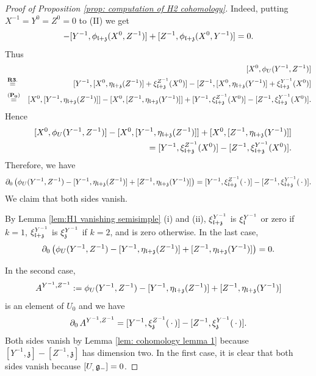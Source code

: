 \documentclass[12pt]{amsart}
\theoremstyle{plain}
\theoremstyle{definition}
\begin{document}
\begin{proof} [Proof of Proposition \ref{prop: computation of H2 cohomology}]
Indeed, putting $X^{-1}=Y^0=Z^0=0$ to (II) we get
  \begin{eqnarray*}
  [X^0, \phi_U(Y^{-1}, Z^{-1})]
     - [Y^{-1}, \phi_{\frak l+ \frak z}( X^{0}, Z^{-1})] + [Z^{-1}, \phi_{\frak l+ \frak z}( X^0, Y^{-1})] =0.
  \end{eqnarray*}
Thus
  \begin{eqnarray*}
  &&[X^0, \phi_U(Y^{-1}, Z^{-1})] \\
   &\stackrel{\bf R3.}{=}& [Y^{-1},[X^0, \eta_{\frak l + \frak z}(Z^{-1})] +\xi_{\frak l+\frak z}^{Z^{-1}}(X^0)] - [Z^{-1},[X ^0, \eta_{\frak l + \frak z}(Y^{-1})] +\xi_{\frak l+\frak z}^{Y^{-1}}(X^0)]  \\
   &\stackrel{(\bf P_0)}{=}&  [X^0,[Y^{-1}, \eta_{\frak l + \frak z}(Z^{-1})]]  - [X^0,[ Z^{-1}, \eta_{\frak l + \frak z}(Y^{-1})]]
     +[Y^{-1}, \xi_{\frak l+\frak z}^{Z^{-1}}(X^0)]  -[Z^{-1}, \xi_{\frak l+\frak z}^{Y^{-1}}(X^0)].
  \end{eqnarray*}
  Hence
  \begin{eqnarray*}
   &&[X^0, \phi_U(Y^{-1}, Z^{-1})]
   -[X^0,[Y^{-1}, \eta_{\frak l + \frak z}(Z^{-1})]]  + [X^0,[ Z^{-1}, \eta_{\frak l + \frak z}(Y^{-1})]] \\
   &&=  [Y^{-1}, \xi_{\frak l+\frak z}^{Z^{-1}}(X^0)]  -[Z^{-1}, \xi_{\frak l+\frak z}^{Y^{-1}}(X^0)].
    \end{eqnarray*}
    Therefore, we have
    \begin{eqnarray*}
    \partial_0\left( \phi_U(Y^{-1}, Z^{-1}) -[Y^{-1}, \eta_{\frak l+ \frak z}(Z^{-1})] + [Z^{-1}, \eta_{\frak l + \frak z}(Y^{-1})]\right)
     =[Y^{-1}, \xi_{ \frak l+\frak z}^{Z^{-1}}(\,\cdot\,)]  -[Z^{-1}, \xi_{\frak l+ \frak z}^{Y^{-1}}(\,\cdot\,)].
    \end{eqnarray*}
    We claim that both sides vanish.

   By Lemma \ref{lem:H1 vanishing semisimple} (i) and (ii), $\xi_{\frak l+ \frak z}^{Y^{-1}}$ is $\xi_{\frak l}^{Y^{-1}}$ or zero if $k=1$, $\xi_{\frak l+ \frak z}^{Y^{-1}} $ is  $\xi_{\frak z}^{Y^{-1}}$ if $k=2$, and is zero otherwise.
   In the last case,
   $$\partial_0\left( \phi_U(Y^{-1}, Z^{-1}) -[Y^{-1}, \eta_{\frak l+ \frak z}(Z^{-1})] + [Z^{-1}, \eta_{\frak l + \frak z}(Y^{-1})]\right) =0.$$

   In the second case,
   $$A^{Y^{-1},Z^{-1}}:=\phi_U(Y^{-1}, Z^{-1}) -[Y^{-1}, \eta_{\frak l+ \frak z}(Z^{-1})] + [Z^{-1}, \eta_{\frak l + \frak z}(Y^{-1})]$$
   is an element of $U_0$ and we have
    $$\partial_0 \,A^{Y^{-1},Z^{-1}} =[Y^{-1}, \xi_{ \frak z}^{Z^{-1}}(\,\cdot\,)]  -[Z^{-1}, \xi_{ \frak z}^{Y^{-1}}(\,\cdot\,)].$$
   Both sides vanish by Lemma \ref{lem: cohomology lemma 1} because $[Y^{-1},\mathfrak z] -[Z^{-1}, \mathfrak z]$ has dimension two.
    In the first case, it is clear that both sides vanish because $[U_, \, \frak g_-]=0$.


\end{proof}
\end{document}
